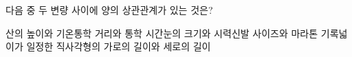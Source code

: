 다음 중 두 변량 사이에 양의 상관관계가 있는 것은?
\begin{choicesii}{산의 높이와 기온}{통학 거리와 통학 시간}{눈의 크기와 시력}{신발 사이즈와 마라톤 기록}{넓이가 일정한 직사각형의 가로의 길이와 세로의 길이}\end{choicesii}
